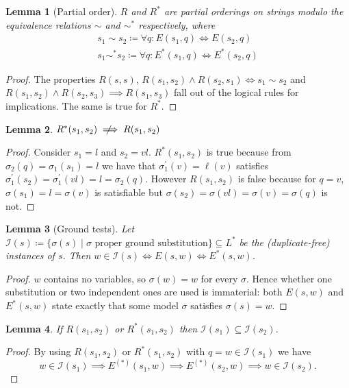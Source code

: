 \documentclass[a4paper, 12pt]{article}
\newcommand{\notimplies}{%
  \mathrel{{\ooalign{\hidewidth$\not\phantom{=}$\hidewidth\cr$\implies$}}}}
\newcommand{\shortiff}{\Leftrightarrow}
\newtheorem{lemma}{Lemma}[section]
\begin{document}
\begin{lemma}[Partial order]
$R$ and $R^*$ are partial orderings on strings modulo the equivalence relations $\sim$ and $\sim^*$ respectively, where
\begin{gather*}
s_1 \sim s_2 \coloneqq \forall q: E(s_1, q) \shortiff E(s_2, q)
\\
s_1 \sim^* s_2 \coloneqq \forall q: E^*(s_1, q) \shortiff E^*(s_2, q)
\end{gather*}
\end{lemma}
\begin{proof}
The properties $R(s, s)$, $R(s_1, s_2) \land R(s_2, s_1) \iff s_1 \sim s_2$ and $R(s_1, s_2) \land R(s_2, s_3) \implies R(s_1, s_3)$ fall out of the logical rules for implications.
The same is true for $R^*$.
\end{proof}

\begin{lemma}
$R^*(s_1, s_2) \notimplies R(s_1, s_2)$
\end{lemma}
\begin{proof}
Consider $s_1 = l$ and $s_2 = v l$. $R^*(s_1, s_2)$ is true because from $\sigma_2(q) = \sigma_1(s_1) = l$ we have that $\sigma_1^\prime(v) = \ell(v)$ satisfies $\sigma_1^\prime(s_2) = \sigma_1^\prime(v l) = l = \sigma_2(q)$. However $R(s_1, s_2)$ is false because for $q = v$, $\sigma(s_1) = l = \sigma(v)$ is satisfiable but $\sigma(s_2) = \sigma(v l) = \sigma(v) = \sigma(q)$ is not.
\end{proof}

\newcommand{\I}{\mathcal{I}}

\begin{lemma}[Ground tests]\label{lem:ground}
Let $\I(s) \coloneqq \{\sigma(s) \mid \sigma \text{ proper ground substitution} \} \subseteq L^*$ be the (duplicate-free) instances of $s$. Then
$w \in \I(s) \iff E(s, w) \iff E^*(s, w) $.
\end{lemma}
\begin{proof}
$w$ contains no variables, so $\sigma(w) = w$ for every $\sigma$. Hence whether one
substitution or two independent ones are used is immaterial: both $E(s,w)$ and
$E^*(s,w)$ state exactly that some model $\sigma$ satisfies $\sigma(s) = w$.
\end{proof}

\begin{lemma}\label{lem:RimpliesSubset}
If $R(s_1, s_2)$ or $R^*(s_1, s_2)$ then $\I(s_1) \subseteq \I(s_2)$.
\end{lemma}
\begin{proof}
By using $R(s_1, s_2)$ or $R^*(s_1, s_2)$ with $q = w \in \I(s_1)$ we have
\begin{equation*}
w \in \I(s_1) \implies E^{(*)}(s_1, w) \implies E^{(*)}(s_2, w) \implies w \in \I(s_2).
\end{equation*}
\end{proof}
\end{document}
